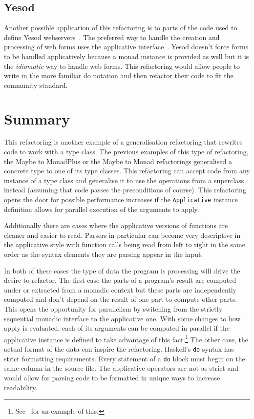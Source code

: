 \subsection{Yesod}
Another possible application of this refactoring is to parts of the code used to define Yesod webservers~\citep{yesod}. The preferred way to handle the creation and processing of web forms uses the applicative interface~\citep{yesodBook}. Yesod doesn't force forms to be handled applicatively because a monad instance is provided as well but it is the \textit{idiomatic} way to handle web forms. This refactoring would allow people to write in the more familiar do notation and then refactor their code to fit the community standard.

\section{Summary}

This refactoring is another example of a generalisation refactoring that rewrites code to work with a type class. The previous examples of this type of refactoring, the Maybe to MonadPlus or the Maybe to Monad refactorings generalised a concrete type to one of its type classes. This refactoring can accept code from any instance of a type class and generalise it to use the operations from a superclass instead (assuming that code passes the preconditions of course). This refactoring opens the door for possible performance increases if the \texttt{Applicative} instance definition allows for parallel execution of the arguments to apply.

Additionally there are cases where the applicative versions of functions are cleaner and easier to read. Parsers in particular can become very descriptive in the applicative style with function calls being read from left to right in the same order as the syntax elements they are parsing appear in the input. 

In both of these cases the type of data the program is processing will drive the desire to refactor. The first case the parts of a program's result are computed under or extracted from a monadic context but these parts are independently computed and don't depend on the result of one part to compute other parts. This opens the opportunity for parallelism by switching from the strictly sequential monadic interface to the applicative one. With some changes to how apply is evaluated, each of its arguments can be computed in parallel if the applicative instance is defined to take advantage of this fact.\footnote{See~\cite{haxl} for an example of this.} The other case, the actual format of the data can inspire the refactoring. Haskell's \texttt{do} syntax has strict formatting requirements. Every statement of a \texttt{do} block must begin on the same column in the source file. The applicative operators are not as strict and would allow for parsing code to be formatted in unique ways to increase readability. 

